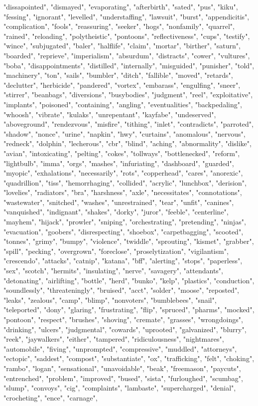"dissapointed", "dismayed", "evaporating", "afterbirth", "sated", "pus", "kiku", "fessing", "ignorant", "levelled", "understaffing", "lawsuit", "burst", "appendicitis", "complication", "fools", "reassuring", "seeker", "hogs", "nonfamily", "quarrel", "rained", "reloading", "polytheistic", "pontoons", "reflectiveness", "cups", "testify", "wince", "subjugated", "baler", "halflife", "claim", "mortar", "birther", "saturn", "boarded", "reprieve", "imperialism", "absurdum", "distracts", "cower", "vultures", "boba", "disappointments", "distilled", "internally", "misguided", "punisher", "told", "machinery", "ton", "sails", "bumbler", "ditch", "fallible", "moved", "retards", "declutter", "herbicide", "pandered", "vortex", "embarass", "engulfing", "sneer", "stirrer", "beanbags", "diversions", "busybodies", "judgment", "reel", "exploitative", "implants", "poisoned", "containing", "angling", "eventualities", "backpedaling", "whoosh", "vibrate", "kulaks", "unrepentant", "kayfabe", "undeserved", "aboveground", "rendezvous", "misfire", "tithing", "inlet", "contradicts", "parroted", "shadow", "nonce", "urine", "napkin", "hwy", "curtains", "anomalous", "nervous", "redneck", "dolphin", "lecherous", "cbr", "blind", "aching", "abnormality", "dislike", "avian", "intoxicating", "pelting", "cokes", "tollways", "bottlenecked", "reform", "lightbulb", "imma", "orgs", "mashes", "infuriating", "dashboard", "guarded", "myopic", "exhalations", "necessarily", "rots", "copperhead", "cares", "anorexic", "quadrillion", "tiss", "hemorrhaging", "collided", "acrylic", "lunchbox", "derision", "lovelies", "radiators", "bra", "harshness", "axle", "necessitates", "connotations", "wastewater", "snitched", "washes", "unrestrained", "tear", "unfit", "canines", "vanquished", "indignant", "shakes", "dorky", "juror", "feeble", "centerline", "mayhem", "hijack", "prowler", "sniping", "orchestrating", "pretending", "ninjas", "evacuation", "goobers", "disrespecting", "shoebox", "carpetbagging", "scooted", "tonnes", "grimy", "bumpy", "violence", "twiddle", "sprouting", "kismet", "grabber", "spill", "pecking", "overgrown", "foreclose", "proselytization", "vigilantism", "crescendo", "attacks", "catnip", "katana", "bff", "alerting", "stops", "paperless", "sex", "scotch", "hermits", "insulating", "nerve", "savagery", "attendants", "detonating", "airlifting", "bottle", "herd", "bunko", "kelp", "plastics", "conduction", "soundlessly", "threateningly", "bruised", "acct", "solder", "moose", "reposted", "leaks", "zealous", "camp", "blimp", "nonvoters", "bumblebees", "snail", "teleported", "dony", "glaring", "frustrating", "flip", "spruced", "pharms", "mocked", "pontoon", "respect", "brushes", "shoving", "cremate", "grasses", "wrongdoings", "drinking", "ulcers", "judgmental", "cowards", "uprooted", "galvanized", "blurry", "reek", "jaywalkers", "either", "tampered", "ridiculousness", "nightmares", "automobile", "fiving", "unprompted", "compressive", "muddled", "attorneys", "ectopic", "saddest", "compost", "substantiate", "ox", "trafficking", "felt", "choking", "rambo", "logan", "sensational", "unavoidable", "beak", "freemason", "paycuts", "entrenched", "problem", "improved", "bused", "sista", "furloughed", "scumbag", "slump", "convoys", "cig", "complaints", "lambaste", "supercharged", "denial", "crocheting", "ence", "carnage", 